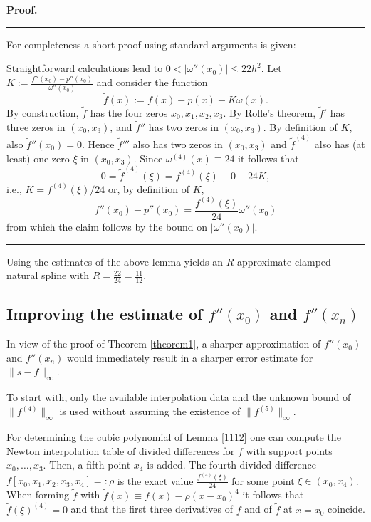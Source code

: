\documentclass[12pt]{article}
\newenvironment{proof}{\begin{list}{$\!\!${\bf Proof.}%
  \rule{1pt}{0pt}}{\setlength{\leftmargin}{0pt}%
  \setlength{\itemindent}{30pt}%
  \setlength{\listparindent}{15pt}}\item}{\rule{0.3em}{0mm}%
  \hfill\framebox[1.2ex]{\rule{0.3em}{0mm}}\end{list}}
\begin{document}
\begin{proof}
For completeness a short proof using standard arguments is given:

Straightforward calculations lead to $0<|\omega''(x_0)|\le 22h^2$.
Let $K:=\tfrac{f''(x_0)-p''(x_0)}{\omega''(x_0)}$ and consider the function
$$
\tilde f(x):=f(x)-p(x)-K\omega(x).
$$
By construction, $\tilde f$ has the four zeros $x_0,x_1,x_2,x_3$.
By Rolle's theorem, $\tilde f'$ has three zeros in $(x_0,x_3)$, and $\tilde f''$
has two zeros in  $(x_0,x_3)$. By definition of $K$, also
$\tilde f''(x_0)=0$. Hence $\tilde f'''$ also has two zeros in  $(x_0,x_3)$
and $\tilde f^{(4)}$ also has (at least)
one zero $\xi$ in  $(x_0,x_3)$.
Since $\omega^{(4)}(x)\equiv 24$ it follows that
$$
0=\tilde f^{(4)}(\xi)=f^{(4)}(\xi)-0-24K,
$$
i.e., $K = f^{(4)}(\xi)/24$ or, by definition of $K$,
$$
f''(x_0)-p''(x_0)=\frac{f^{(4)}(\xi)}{24}\omega''(x_0)
$$
from which the claim follows by the bound on $|\omega''(x_0)|$.
\end{proof}

Using the estimates of the above lemma  yields
an $R$-approximate clamped natural spline with $R=\tfrac{22}{24}=\tfrac{11}{12}$.





\subsection{Improving the estimate of $f''(x_0)$ and $f''(x_n)$}
\label{sec.improving}

In view of the proof of Theorem \ref{theorem1},
a sharper approximation of $f''(x_0)$ and $f''(x_n)$ would immediately
result in a sharper error estimate for $\|s-f\|_\infty$.

To start with, only the available interpolation data and the
unknown bound of $\|f^{(4)}\|_\infty$ is used
without assuming the existence of $\|f^{(5)}\|_\infty$.


For determining the cubic polynomial of Lemma \ref{1112} 
one can compute the Newton interpolation table of divided differences for $f$
with support points $x_0,\ldots,x_3$. Then, a fifth point $x_4$ is added.
The fourth divided difference $f[x_0,x_1,x_2,x_3,x_4]=:\rho$
is the exact value $\tfrac{f^{(4)}(\xi)}{24}$
for some point $\xi\in(x_0,x_4)$.  When forming $\tilde f$ with $\tilde f(x)\equiv f(x)-
\rho(x-x_0)^4$ it follows that $\tilde f(\xi)^{(4)}=0$ and that the first
three derivatives of $ f$ and of $\tilde f$ at $x=x_0$ coincide.
\end{document}
